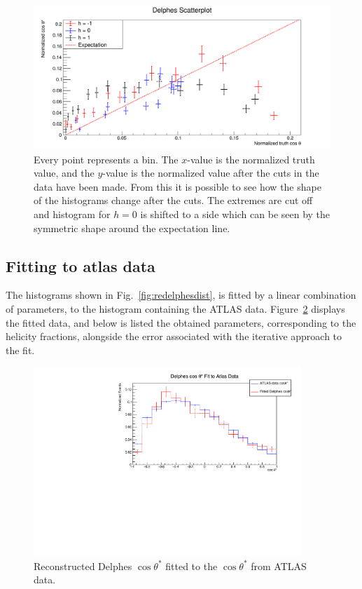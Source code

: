 \documentclass[12pt,a4paper]{article}
\numberwithin{equation}{section}
\begin{document}
\begin{figure}[H]
  \centering
  \includegraphics[width=\linewidth]{figures/scatterplot}
  \caption{\label{fig:scatterplot}Every point represents a bin. The $x$-value is
    the normalized truth value, and the $y$-value is the normalized value after
    the cuts in the data have been made. From this it is possible to see how the
    shape of the histograms change after the cuts. The extremes are cut off and
    histogram for $h=0$ is shifted to a side which can be seen by the symmetric
    shape around the expectation line.}
\end{figure}

\subsection{Fitting to atlas data}
The histograms shown in Fig.~\ref{fig:redelphesdist}, is fitted by a linear
combination of parameters, to the histogram containing the ATLAS data.
Figure~\ref{fig:delphesfit} displays the fitted data, and below is listed the
obtained parameters, corresponding to the helicity fractions, alongside the
error associated with the iterative approach to the fit.

\begin{figure}[H]
  \centering
  \includegraphics[width=0.9\textwidth]{figures/delphes_fit}
  \caption{\label{fig:delphesfit}Reconstructed Delphes $\cos \theta^{*}$ fitted to
    the $\cos \theta^{*}$ from ATLAS data.}
\end{figure}
\end{document}
